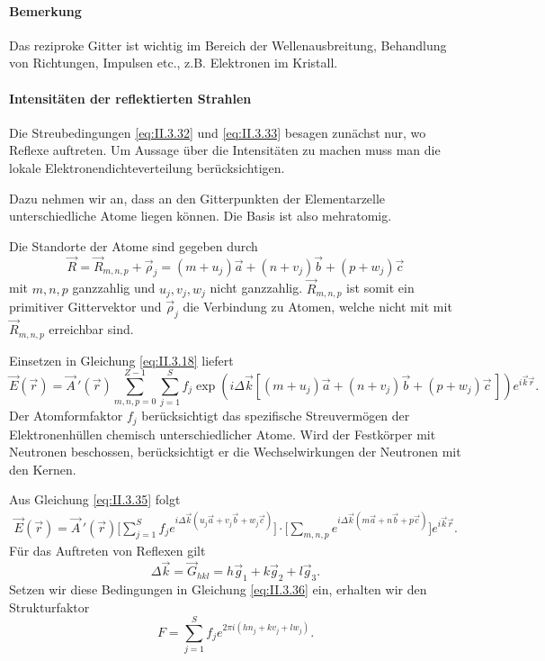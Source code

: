 \paragraph{Bemerkung}
	Das reziproke Gitter ist wichtig im Bereich der Wellenausbreitung, Behandlung von Richtungen, Impulsen etc., z.B. Elektronen im Kristall.

\paragraph{Intensitäten der reflektierten Strahlen}
	Die Streubedingungen \eqref{eq:II.3.32} und \eqref{eq:II.3.33} besagen zunächst nur, wo Reflexe auftreten. 
	Um Aussage über die Intensitäten zu machen muss man die lokale Elektronendichteverteilung berücksichtigen.

	Dazu nehmen wir an, dass an den Gitterpunkten der Elementarzelle unterschiedliche Atome liegen können. Die Basis ist also mehratomig.

	Die Standorte der Atome sind gegeben durch
	\begin{equation}
		\label{eq:II.3.34}
		\Vec{R} = \Vec{R}_{m,n,p} + \Vec{\rho}_{j} = \left( m + u_{j} \right) \Vec{a} + \left( n + v_{j} \right) \Vec{b} + \left( p + w_{j} \right) \Vec{c}
	\end{equation}
	mit $m,n,p$ ganzzahlig und $u_{j}, v_{j}, w_{j} $ nicht ganzzahlig. 
	$\vec R_{m,n,p}$ ist somit ein primitiver Gittervektor und $\vec\rho_j$ die Verbindung zu Atomen, welche nicht mit mit $\vec R_{m,n,p}$ erreichbar sind.

	Einsetzen in Gleichung \eqref{eq:II.3.18} liefert
	\begin{equation}
		\Vec{E} (\Vec{r}) = \Vec{A}\,' (\Vec{r}) \sum_{m,n,p = 0}^{Z-1} \sum_{j = 1}^{S} f_{j} \exp\left( i \Delta \Vec{k} \left[ \left( m + u_{j} \right) \Vec{a} + \left( n + v_{j} \right) \Vec{b} + \left( p + w_{j} \right) \Vec{c}\,\right]  \right) e^{i\Vec{k} \Vec{r}}.
		\label{eq:II.3.35}
	\end{equation}
	Der Atomformfaktor $f_j$ berücksichtigt das spezifische Streuvermögen der Elektronenhüllen chemisch unterschiedlicher Atome. 
	Wird der Festkörper mit Neutronen beschossen, berücksichtigt er die Wechselwirkungen der Neutronen mit den Kernen.

	Aus Gleichung \eqref{eq:II.3.35} folgt
	\begin{equation}
		\label{eq:II.3.36}
		\begin{split}
			\Vec{E} (\Vec{r}) = \Vec{A}\,'(\Vec{r}) \Bigg[ \sum_{j = 1}^{S}  f_{j} e^{i \Delta \Vec{k} \left( u_{j} \Vec{a} + v_{j} \Vec{b} + w_{j} \Vec{c} \right) }  \Bigg] 
			\cdot \Bigg[ \sum_{m,n,p}^{} e^{i \Delta \Vec{k} \left( m \Vec{a} + n \Vec{b} + p \Vec{c} \right) }   \Bigg] e^{i\Vec{k}\Vec{r}}.
		\end{split}
	\end{equation}
	Für das Auftreten von Reflexen gilt
	$$
	\Delta \Vec{k} = \Vec{G}_{hkl} = h \Vec{g}_{1} + k\Vec{g}_{2} + l\Vec{g}_{3}.
	$$ 
	Setzen wir diese Bedingungen in Gleichung \eqref{eq:II.3.36} ein, erhalten wir den Strukturfaktor
	\begin{equation}
		\label{eq:II.3.37}
		F = \sum_{j = 1}^{S}  f_{j} e^{2\pi i \left( hn_{j} + kv_{j} + lw_{j} \right) }.
	\end{equation}
